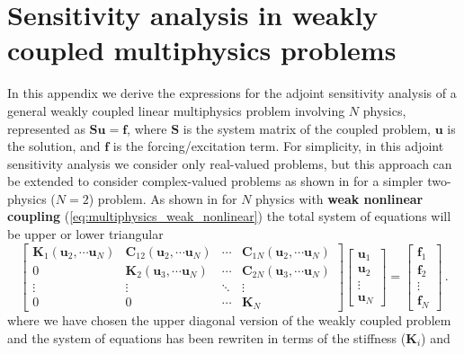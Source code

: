 \section{Sensitivity analysis in weakly coupled multiphysics problems}\label{app:appendix1}
In this appendix we derive the expressions for the adjoint sensitivity analysis of a general weakly coupled linear multiphysics problem involving $N$ physics, represented as $\mathbf{S}\mathbf{u}=\mathbf{f}$, where $\mathbf{S}$ is the system matrix of the coupled problem, $\mathbf{u}$ is the solution, and $\mathbf{f}$ is the forcing/excitation term. For simplicity, in this adjoint sensitivity analysis we consider
only real-valued problems, but this approach can be extended to consider complex-valued problems
as shown in \cite{ownpub0} for a simpler two-physics ($N=2$) problem.
As shown in  for $N$ physics with \textbf{weak nonlinear coupling} (\eqref{eq:multiphysics_weak_nonlinear}) the total system of equations will be upper or lower triangular
\begin{equation} \label{eq:app_multiphysics_weak}
    \begin{bmatrix}
        \mathbf{K}_1(\mathbf{u}_2, \cdots \mathbf{u}_N)    & \mathbf{C}_{12} (\mathbf{u}_2, \cdots \mathbf{u}_N)& \cdots & \mathbf{C}_{1N}(\mathbf{u}_2, \cdots \mathbf{u}_N) \\
        0 & \mathbf{K}_2 (\mathbf{u}_3, \cdots \mathbf{u}_N)   & \cdots & \mathbf{C}_{2N} (\mathbf{u}_3, \cdots \mathbf{u}_N)\\
        \vdots          & \vdots          & \ddots & \vdots          \\
        0& 0 & \cdots & \mathbf{K}_N
    \end{bmatrix}
    \begin{bmatrix}
        \mathbf{u}_1 \\
        \mathbf{u}_2 \\
        \vdots       \\
        \mathbf{u}_N
    \end{bmatrix}
    =
    \begin{bmatrix}
        \mathbf{f}_1\\
        \mathbf{f}_2\\
        \vdots       \\
        \mathbf{f}_N
    \end{bmatrix}\,.
\end{equation}
where we have chosen the upper diagonal version of the weakly coupled problem and the system of equations has been rewriten in terms of the stiffness ($\mathbf{K}_i$) and 
